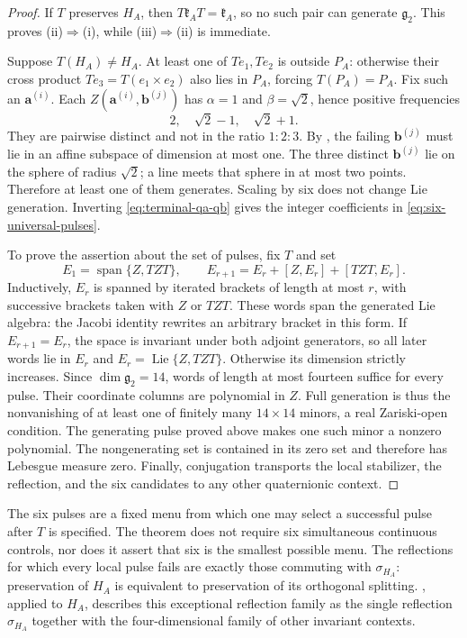 \documentclass[11pt,a4paper]{article}
\newcommand{\Lie}{\operatorname{Lie}}
\newcommand{\Span}{\operatorname{span}}
\begin{document}
\begin{proof}
If $T$ preserves $H_A$, then $T\mathfrak k_AT=\mathfrak k_A$, so no such pair can generate $\mathfrak g_2$.  This proves (ii)$\Rightarrow$(i), while (iii)$\Rightarrow$(ii) is immediate.

Suppose $T(H_A)\ne H_A$.  At least one of $Te_1,Te_2$ is outside $P_A$: otherwise their cross product $Te_3=T(e_1\times e_2)$ also lies in $P_A$, forcing $T(P_A)=P_A$.  Fix such an $\mathbf a^{(i)}$.  Each $Z(\mathbf a^{(i)},\mathbf b^{(j)})$ has $\alpha=1$ and $\beta=\sqrt2$, hence positive frequencies
\[
2,\quad \sqrt2-1,\quad \sqrt2+1.
\]
They are pairwise distinct and not in the ratio $1:2:3$.  By , the failing $\mathbf b^{(j)}$ must lie in an affine subspace of dimension at most one.  The three distinct $\mathbf b^{(j)}$ lie on the sphere of radius $\sqrt2$; a line meets that sphere in at most two points.  Therefore at least one of them generates.  Scaling by six does not change Lie generation.  Inverting \eqref{eq:terminal-qa-qb} gives the integer coefficients in \eqref{eq:six-universal-pulses}.

To prove the assertion about the set of pulses, fix $T$ and set
\[
E_1=\Span\{Z,TZT\},\qquad E_{r+1}=E_r+[Z,E_r]+[TZT,E_r].
\]
Inductively, $E_r$ is spanned by iterated brackets of length at most $r$, with
successive brackets taken with $Z$ or $TZT$.  These words span the generated
Lie algebra: the Jacobi identity rewrites an arbitrary bracket in this form.
If $E_{r+1}=E_r$, the space is invariant under both adjoint generators, so all
later words lie in $E_r$ and $E_r=\Lie\{Z,TZT\}$.  Otherwise its dimension
strictly increases.  Since $\dim\mathfrak g_2=14$, words of length at most
fourteen suffice for every pulse.
Their coordinate columns are polynomial in $Z$.  Full generation is thus the
nonvanishing of at least one of finitely many $14\times14$ minors, a real
Zariski-open condition.  The generating pulse proved above makes one such
minor a nonzero polynomial.  The nongenerating set is contained in its zero
set and therefore has Lebesgue measure zero.  Finally, conjugation transports
the local stabilizer, the reflection, and the six candidates to any other
quaternionic context.
\end{proof}

The six pulses are a fixed menu from which one may select a successful pulse after $T$ is specified.  The theorem does not require six simultaneous continuous controls, nor does it assert that six is the smallest possible menu.  The reflections for which every local pulse fails are exactly those commuting with $\sigma_{H_A}$: preservation of $H_A$ is equivalent to preservation of its orthogonal splitting.  , applied to $H_A$, describes this exceptional reflection family as the single reflection $\sigma_{H_A}$ together with the four-dimensional family of other invariant contexts.
\end{document}
